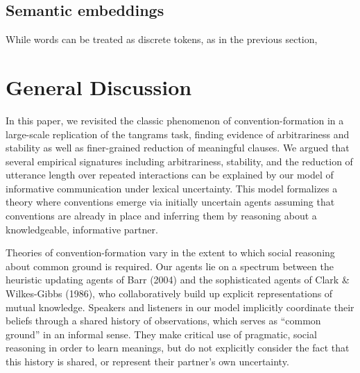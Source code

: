 \documentclass[alpha-refs]{wiley-article}
\begin{document}
\subsection{Semantic embeddings}\label{arbitrariness-and-stability}

While words can be treated as discrete tokens, as in the previous section, 


\section{General Discussion}\label{general-discussion}

In this paper, we revisited the classic phenomenon of
convention-formation in a large-scale replication of the tangrams task,
finding evidence of arbitrariness and stability as well as finer-grained
reduction of meaningful clauses. We argued that several empirical
signatures including arbitrariness, stability, and the reduction of
utterance length over repeated interactions can be explained by our
model of informative communication under lexical uncertainty. This model
formalizes a theory where conventions emerge via initially uncertain
agents assuming that conventions are already in place and inferring them
by reasoning about a knowledgeable, informative partner.

Theories of convention-formation vary in the extent to which social
reasoning about common ground is required. Our agents lie on a spectrum
between the heuristic updating agents of Barr (2004) and the
sophisticated agents of Clark \& Wilkes-Gibbs (1986), who
collaboratively build up explicit representations of mutual knowledge.
Speakers and listeners in our model implicitly coordinate their beliefs
through a shared history of observations, which serves as ``common
ground'' in an informal sense. They make critical use of pragmatic,
social reasoning in order to learn meanings, but do not explicitly
consider the fact that this history is shared, or represent their
partner's own uncertainty.
\end{document}
